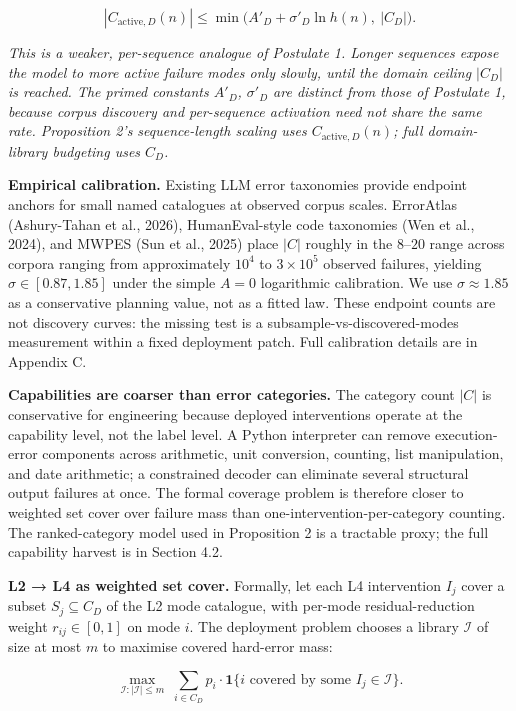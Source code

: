 \documentclass[
]{article}
\begin{document}
\[
|C_{\text{active},D}(n)| \leq \min\bigl(A'_D + \sigma'_D \ln h(n),\ |C_D|\bigr).
\]

\emph{This is a weaker, per-sequence analogue of Postulate 1. Longer
sequences expose the model to more active failure modes only slowly,
until the domain ceiling \(|C_D|\) is reached. The primed constants
\(A'_D\), \(\sigma'_D\) are distinct from those of Postulate 1, because
corpus discovery and per-sequence activation need not share the same
rate. Proposition 2's sequence-length scaling uses
\(C_{\text{active},D}(n)\); full domain-library budgeting uses \(C_D\).}

\textbf{Empirical calibration.} Existing LLM error taxonomies provide
endpoint anchors for small named catalogues at observed corpus scales.
ErrorAtlas (Ashury-Tahan et al., 2026), HumanEval-style code taxonomies
(Wen et al., 2024), and MWPES (Sun et al., 2025) place \(|C|\) roughly
in the \(8\)--\(20\) range across corpora ranging from approximately
\(10^4\) to \(3 \times 10^5\) observed failures, yielding
\(\sigma \in [0.87, 1.85]\) under the simple \(A=0\) logarithmic
calibration. We use \(\sigma \approx 1.85\) as a conservative planning
value, not as a fitted law. These endpoint counts are not discovery
curves: the missing test is a subsample-vs-discovered-modes measurement
within a fixed deployment patch. Full calibration details are in
Appendix C.

\textbf{Capabilities are coarser than error categories.} The category
count \(|C|\) is conservative for engineering because deployed
interventions operate at the capability level, not the label level. A
Python interpreter can remove execution-error components across
arithmetic, unit conversion, counting, list manipulation, and date
arithmetic; a constrained decoder can eliminate several structural
output failures at once. The formal coverage problem is therefore closer
to weighted set cover over failure mass than
one-intervention-per-category counting. The ranked-category model used
in Proposition 2 is a tractable proxy; the full capability harvest is in
Section 4.2.

\textbf{L2 → L4 as weighted set cover.} Formally, let each L4
intervention \(I_j\) cover a subset \(S_j \subseteq C_D\) of the L2 mode
catalogue, with per-mode residual-reduction weight \(r_{ij} \in [0, 1]\)
on mode \(i\). The deployment problem chooses a library \(\mathcal{I}\)
of size at most \(m\) to maximise covered hard-error mass:

\[
\max_{\mathcal{I} : |\mathcal{I}| \leq m}\; \sum_{i \in C_D} p_i \cdot \mathbf{1}\{i \text{ covered by some } I_j \in \mathcal{I}\}.
\]
\end{document}

